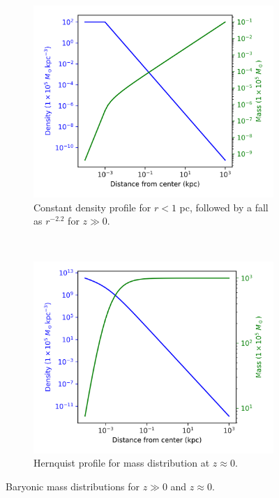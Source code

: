 			\pagebreak
		
			\begin{figure}[h]
				\centering
				\begin{subfigure}[b]{0.49\textwidth}
					\includegraphics[width=\textwidth]{"../Files/Week 3/gaseous"}
					\caption{Constant density profile for $r < 1$ pc, followed by a fall as $r^{-2.2}$ for $z \gg 0$.}
					\label{fig: baryonicprofilehigh}
				\end{subfigure}
				~ 
				\begin{subfigure}[b]{0.49\textwidth}
					\includegraphics[width=\textwidth]{"../Files/Week 3/hernquist"}
					\caption{Hernquist profile for mass distribution at $z \approx 0$.}
						\label{fig: baryonicprofilelow}
				\end{subfigure}
				\caption{Baryonic mass distributions for $z \gg 0$ and $z \approx 0$.}
				\label{fig: baryonicprofile}
			\end{figure}

